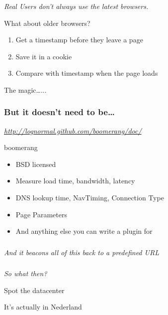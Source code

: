 \documentclass{beamer}
\newcommand{\innersplash}[1]{
  \begin{center}
    \Large \textrm{\textit{ #1 } }
  \end{center}
}
\newcommand{\splashslide}[2][{}]{
  \begin{frame}
  \frametitle{#1}
  \innersplash{#2}
  \end{frame}
}
\begin{document}
\splashslide{Real Users don't always use the latest browsers.}

\begin{frame}{What about older browsers?}
  \begin{enumerate}
  \item Get a timestamp before they leave a page
  \item Save it in a cookie
  \item Compare with timestamp when the page loads
  \end{enumerate}
\end{frame}

\begin{frame}{The magic\ldots...}
\end{frame}

\splashslide[But it doesn't need to be\ldots]{\href{http://www.realusermeasurement.org/}{http://lognormal.github.com/boomerang/doc/}}

\begin{frame}{boomerang}
  \begin{itemize}
    \item BSD licensed
    \item Measure load time, bandwidth, latency
    \item DNS lookup time, NavTiming, Connection Type
    \item Page Parameters
    \item And anything else you can write a plugin for
  \end{itemize}
\end{frame}

\splashslide{And it beacons all of this back to a predefined URL}

\splashslide{So what then?}

\begin{frame}{Spot the datacenter}
\end{frame}

\begin{frame}{It's actually in Nederland}
\end{frame}
\end{document}
